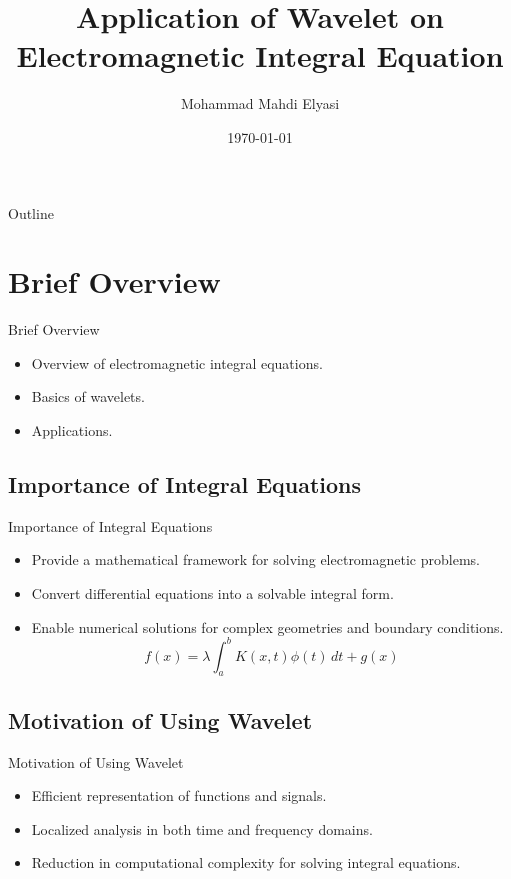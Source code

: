 \documentclass{beamer}
\title[Wavelet on Integral Equation]{Application of Wavelet on Electromagnetic Integral Equation}
\author[]{Mohammad Mahdi Elyasi}
\institute[Amirkabir University of Techonology]{
    Supervisor: Dr. Moradi \\[1cm] %
    Faculty of Electrical Engineering \\ %
}
\date{\today} %
\begin{document}
\begin{frame}
    
    \titlepage
\end{frame}

\begin{frame}{Outline}
    \tableofcontents
\end{frame}

\section{Brief Overview}
\begin{frame}{Brief Overview}
    \begin{itemize}
        \vspace*{-\baselineskip}
        \item Overview of electromagnetic integral equations.
        \item Basics of wavelets.
        \item Applications.
    \end{itemize}
\end{frame}

\subsection{Importance of Integral Equations}
\begin{frame}{Importance of Integral Equations}
    \begin{itemize}
        \item Provide a mathematical framework for solving electromagnetic problems.
        \item Convert differential equations into a solvable integral form.
        \item Enable numerical solutions for complex geometries and boundary conditions.
        \[
              f(x) = \lambda \int_a^b K(x, t)\phi(t) \,dt + g(x)
        \]
    \end{itemize}
\end{frame}

\subsection{Motivation of Using Wavelet}
\begin{frame}{Motivation of Using Wavelet}
    \begin{itemize}
        \item Efficient representation of functions and signals.
        \item Localized analysis in both time and frequency domains.
        \item Reduction in computational complexity for solving integral equations.
        
    \end{itemize}
\end{frame}
\end{document}
